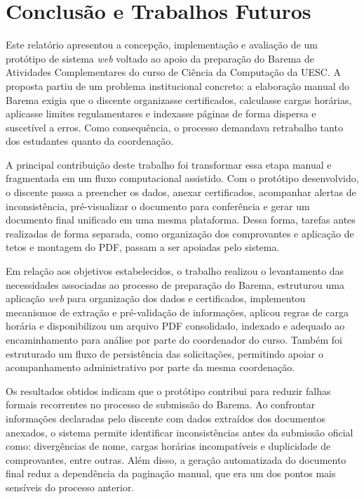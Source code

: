 \chapter{Conclusão e Trabalhos Futuros}
\label{cap:conclusao}

Este relatório apresentou a concepção, implementação e avaliação de um protótipo de sistema \textit{web} voltado ao apoio da preparação do Barema de Atividades Complementares do curso de Ciência da Computação da UESC. A proposta partiu de um problema institucional concreto: a elaboração manual do Barema exigia que o discente organizasse certificados, calculasse cargas horárias, aplicasse limites regulamentares e indexasse páginas de forma dispersa e suscetível a erros. Como consequência, o processo demandava retrabalho tanto dos estudantes quanto da coordenação.

A principal contribuição deste trabalho foi transformar essa etapa manual e fragmentada em um fluxo computacional assistido. Com o protótipo desenvolvido, o discente passa a preencher os dados, anexar certificados, acompanhar alertas de inconsistência, pré-visualizar o documento para conferência e gerar um documento final unificado em uma mesma plataforma. Dessa forma, tarefas antes realizadas de forma separada, como organização dos comprovantes e aplicação de tetos e montagem do PDF, passam a ser apoiadas pelo sistema.

Em relação aos objetivos estabelecidos, o trabalho realizou o levantamento das necessidades associadas ao processo de preparação do Barema, estruturou uma aplicação \textit{web} para organização dos dados e certificados, implementou mecanismos de extração e pré-validação de informações, aplicou regras de carga horária e disponibilizou um arquivo PDF consolidado, indexado e adequado ao encaminhamento para análise por parte do coordenador do curso. Também foi estruturado um fluxo de persistência das solicitações, permitindo apoiar o acompanhamento administrativo por parte da mesma coordenação.

Os resultados obtidos indicam que o protótipo contribui para reduzir falhas formais recorrentes no processo de submissão do Barema. Ao confrontar informações declaradas pelo discente com dados extraídos dos documentos anexados, o sistema permite identificar inconsistências antes da submissão oficial como: divergências de nome, cargas horárias incompatíveis e duplicidade de comprovantes, entre outras. Além disso, a geração automatizada do documento final reduz a dependência da paginação manual, que era um dos pontos mais sensíveis do processo anterior.

